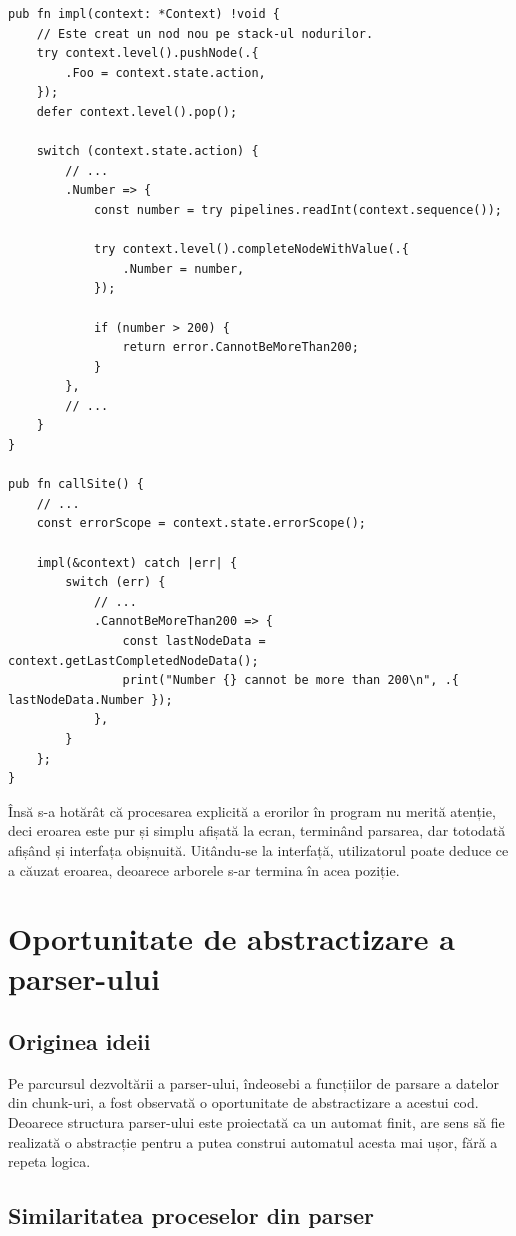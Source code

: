 \documentclass[a4paper,12pt]{report}
\begin{document}
\begin{verbatim}
pub fn impl(context: *Context) !void {
    // Este creat un nod nou pe stack-ul nodurilor.
    try context.level().pushNode(.{
        .Foo = context.state.action,
    });
    defer context.level().pop();

    switch (context.state.action) {
        // ...
        .Number => {
            const number = try pipelines.readInt(context.sequence());

            try context.level().completeNodeWithValue(.{
                .Number = number,
            });

            if (number > 200) {
                return error.CannotBeMoreThan200;
            }
        },
        // ...
    }
}

pub fn callSite() {
    // ... 
    const errorScope = context.state.errorScope();

    impl(&context) catch |err| {
        switch (err) {
            // ...
            .CannotBeMoreThan200 => {
                const lastNodeData = context.getLastCompletedNodeData();
                print("Number {} cannot be more than 200\n", .{ lastNodeData.Number });
            },
        }
    };
}
\end{verbatim}

Însă s-a hotărât că procesarea explicită a erorilor în program nu merită atenție,
deci eroarea este pur și simplu afișată la ecran, terminând parsarea,
dar totodată afișând și interfața obișnuită.
Uitându-se la interfață, utilizatorul poate deduce ce a căuzat eroarea,
deoarece arborele s-ar termina în acea poziție.

\section{Oportunitate de abstractizare a parser-ului}

\subsection{Originea ideii}

Pe parcursul dezvoltării a parser-ului, îndeosebi a funcțiilor de parsare a datelor din chunk-uri,
a fost observată o oportunitate de abstractizare a acestui cod.
Deoarece structura parser-ului este proiectată ca un automat finit,
are sens să fie realizată o abstracție pentru a putea construi automatul acesta mai ușor,
fără a repeta logica.

\subsection{Similaritatea proceselor din parser}
\end{document}
